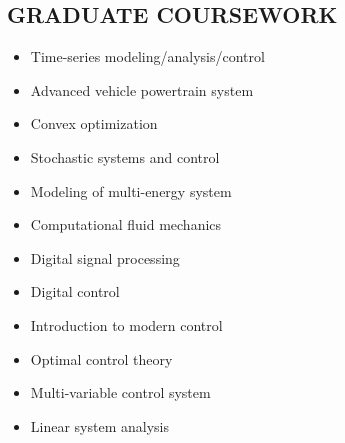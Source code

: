 \documentclass[margin, 9pt]{res} %
\begin{document}
\begin{resume}
\section{GRADUATE COURSEWORK}

\vspace*{-5pt}
\begin{multicols}{2}
\begin{itemize}[leftmargin=*] \itemsep -2pt
   \item Time-series modeling/analysis/control
	\item Advanced vehicle powertrain system
    \item Convex optimization
    \item Stochastic systems and control
    \item Modeling of multi-energy system
    \item Computational fluid mechanics
    \item Digital signal processing
    \item Digital control
    \item Introduction to modern control
    \item Optimal control theory
    \item Multi-variable control system
    \item Linear system analysis
\end{itemize}
\end{multicols}


\end{resume}
\end{document}
